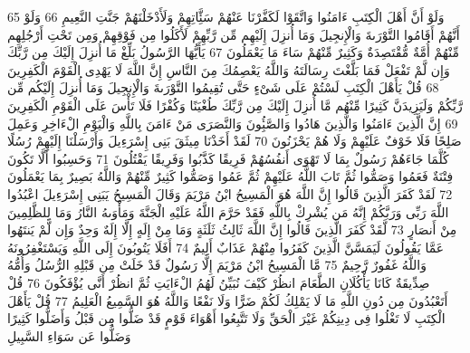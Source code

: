 \documentclass[20pt,a4paper]{article}
\begin{document}
{\tiny\colorbox{cl_aya}{65}} وَلَوْ أَنَّ أَهْلَ الْكِتَبِ ءَامَنُوا وَاتَّقَوْا لَكَفَّرْنَا عَنْهُمْ سَئَِّاتِهِمْ وَلَأَدْخَلْنَهُمْ جَنَّتِ النَّعِيمِ
{\tiny\colorbox{cl_aya}{66}} وَلَوْ أَنَّهُمْ أَقَامُوا التَّوْرَىةَ وَالْإِنجِيلَ وَمَا أُنزِلَ إِلَيْهِم مِّن رَّبِّهِمْ لَأَكَلُوا مِن فَوْقِهِمْ وَمِن تَحْتِ أَرْجُلِهِم مِّنْهُمْ أُمَّةٌ مُّقْتَصِدَةٌ وَكَثِيرٌ مِّنْهُمْ سَاءَ مَا يَعْمَلُونَ
{\tiny\colorbox{cl_aya}{67}} يَأَيُّهَا الرَّسُولُ بَلِّغْ مَا أُنزِلَ إِلَيْكَ مِن رَّبِّكَ وَإِن لَّمْ تَفْعَلْ فَمَا بَلَّغْتَ رِسَالَتَهُ وَاللَّهُ يَعْصِمُكَ مِنَ النَّاسِ إِنَّ اللَّهَ لَا يَهْدِى الْقَوْمَ الْكَفِرِينَ
{\tiny\colorbox{cl_aya}{68}} قُلْ يَأَهْلَ الْكِتَبِ لَسْتُمْ عَلَى شَىْءٍ حَتَّى تُقِيمُوا التَّوْرَىةَ وَالْإِنجِيلَ وَمَا أُنزِلَ إِلَيْكُم مِّن رَّبِّكُمْ وَلَيَزِيدَنَّ كَثِيرًا مِّنْهُم مَّا أُنزِلَ إِلَيْكَ مِن رَّبِّكَ طُغْيَنًا وَكُفْرًا فَلَا تَأْسَ عَلَى الْقَوْمِ الْكَفِرِينَ
{\tiny\colorbox{cl_aya}{69}} إِنَّ الَّذِينَ ءَامَنُوا وَالَّذِينَ هَادُوا وَالصَّبُِٔونَ وَالنَّصَرَى مَنْ ءَامَنَ بِاللَّهِ وَالْيَوْمِ الْءَاخِرِ وَعَمِلَ صَلِحًا فَلَا خَوْفٌ عَلَيْهِمْ وَلَا هُمْ يَحْزَنُونَ
{\tiny\colorbox{cl_aya}{70}} لَقَدْ أَخَذْنَا مِيثَقَ بَنِى إِسْرَءِيلَ وَأَرْسَلْنَا إِلَيْهِمْ رُسُلًا كُلَّمَا جَاءَهُمْ رَسُولٌ بِمَا لَا تَهْوَى أَنفُسُهُمْ فَرِيقًا كَذَّبُوا وَفَرِيقًا يَقْتُلُونَ
{\tiny\colorbox{cl_aya}{71}} وَحَسِبُوا أَلَّا تَكُونَ فِتْنَةٌ فَعَمُوا وَصَمُّوا ثُمَّ تَابَ اللَّهُ عَلَيْهِمْ ثُمَّ عَمُوا وَصَمُّوا كَثِيرٌ مِّنْهُمْ وَاللَّهُ بَصِيرٌ بِمَا يَعْمَلُونَ
{\tiny\colorbox{cl_aya}{72}} لَقَدْ كَفَرَ الَّذِينَ قَالُوا إِنَّ اللَّهَ هُوَ الْمَسِيحُ ابْنُ مَرْيَمَ وَقَالَ الْمَسِيحُ يَبَنِى إِسْرَءِيلَ اعْبُدُوا اللَّهَ رَبِّى وَرَبَّكُمْ إِنَّهُ مَن يُشْرِكْ بِاللَّهِ فَقَدْ حَرَّمَ اللَّهُ عَلَيْهِ الْجَنَّةَ وَمَأْوَىهُ النَّارُ وَمَا لِلظَّلِمِينَ مِنْ أَنصَارٍ
{\tiny\colorbox{cl_aya}{73}} لَّقَدْ كَفَرَ الَّذِينَ قَالُوا إِنَّ اللَّهَ ثَالِثُ ثَلَثَةٍ وَمَا مِنْ إِلَهٍ إِلَّا إِلَهٌ وَحِدٌ وَإِن لَّمْ يَنتَهُوا عَمَّا يَقُولُونَ لَيَمَسَّنَّ الَّذِينَ كَفَرُوا مِنْهُمْ عَذَابٌ أَلِيمٌ
{\tiny\colorbox{cl_aya}{74}} أَفَلَا يَتُوبُونَ إِلَى اللَّهِ وَيَسْتَغْفِرُونَهُ وَاللَّهُ غَفُورٌ رَّحِيمٌ
{\tiny\colorbox{cl_aya}{75}} مَّا الْمَسِيحُ ابْنُ مَرْيَمَ إِلَّا رَسُولٌ قَدْ خَلَتْ مِن قَبْلِهِ الرُّسُلُ وَأُمُّهُ صِدِّيقَةٌ كَانَا يَأْكُلَانِ الطَّعَامَ انظُرْ كَيْفَ نُبَيِّنُ لَهُمُ الْءَايَتِ ثُمَّ انظُرْ أَنَّى يُؤْفَكُونَ
{\tiny\colorbox{cl_aya}{76}} قُلْ أَتَعْبُدُونَ مِن دُونِ اللَّهِ مَا لَا يَمْلِكُ لَكُمْ ضَرًّا وَلَا نَفْعًا وَاللَّهُ هُوَ السَّمِيعُ الْعَلِيمُ
{\tiny\colorbox{cl_aya}{77}} قُلْ يَأَهْلَ الْكِتَبِ لَا تَغْلُوا فِى دِينِكُمْ غَيْرَ الْحَقِّ وَلَا تَتَّبِعُوا أَهْوَاءَ قَوْمٍ قَدْ ضَلُّوا مِن قَبْلُ وَأَضَلُّوا كَثِيرًا وَضَلُّوا عَن سَوَاءِ السَّبِيلِ
\end{document}
